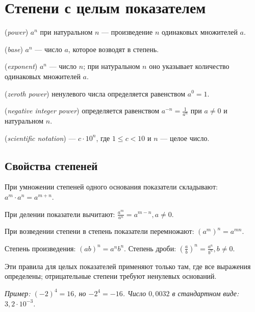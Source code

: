 \chapter{Степени с целым показателем}\label{chap:c06}
\begin{definition} (\emph{power}) \(a^{n}\) при натуральном \(n\) — произведение \(n\) одинаковых множителей \(a\).\end{definition}
\begin{definition} (\emph{base}) \(a^{n}\) — число \(a\), которое возводят в степень.\end{definition}
\begin{definition} (\emph{exponent}) \(a^{n}\) — число \(n\); при натуральном \(n\) оно указывает количество одинаковых множителей \(a\).\end{definition}
\begin{definition} (\emph{zeroth power}) ненулевого числа определяется равенством \(a^{0} = 1\).\end{definition}
\begin{definition} (\emph{negative integer power}) определяется равенством \(a^{- n} = \frac{1}{a^{n}}\) при \(a \ne  0\) и натуральном \(n\).\end{definition}
\begin{definition} (\emph{scientific notation}) — \(c \cdot  10^{n}\), где \(1 \le  c < 10\) и \(n\) — целое число.\end{definition}
\section{Свойства степеней}
При умножении степеней одного основания показатели складывают: \(a^{m} \cdot  a^{n} = a^{m + n}\).\par
При делении показатели вычитают: \(\frac{a^{m}}{a^{n}} = a^{m - n},\allowbreak a \ne  0\).\par
При возведении степени в степень показатели перемножают: \((a^{m})^{n} = a^{mn}\).\par
Степень произведения: \((ab)^{n} = a^{n} b^{n}\). Степень дроби: \((\frac{a}{b})^{n} = \frac{a^{n}}{b^{n}},\allowbreak b \ne  0\).\par
Эти правила для целых показателей применяют только там, где все выражения определены; отрицательные степени требуют ненулевых оснований.\par
{\small\textit{Пример: \((- 2)^{4} = 16\), но \(- 2^{4} = - 16\). Число \(0,0032\) в стандартном виде: \(3{,}2 \cdot  10^{- 3}\).}}\par

